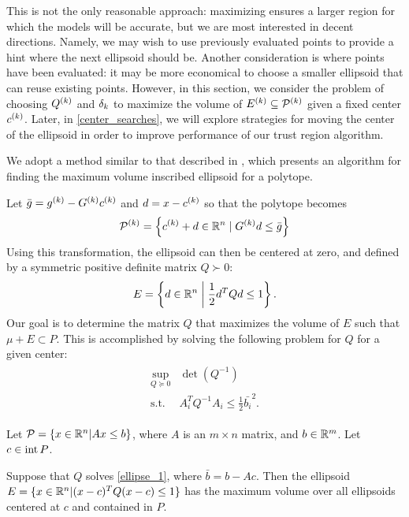 This is not the only reasonable approach: maximizing ensures a larger region for which the models will be accurate, 
but we are most interested in decent directions.
Namely, we may wish to use previously evaluated points to provide a hint where the next ellipsoid should be.
Another consideration is where points have been evaluated: it may be more economical to choose a smaller ellipsoid that can reuse existing points.
However, in this section,  we consider the problem of choosing ${Q^{(k)}}$ and $\delta_k$ to maximize the volume of ${E^{(k)}} \subseteq {{\mathcal{P}}^{(k)}}$ given a fixed center $c^{(k)}$.
Later, in \cref{center_searches}, we will explore strategies for moving the center of the ellipsoid in order to improve performance of our trust region algorithm.

We adopt a method similar to that described in \cite{Khachiyan1993},
which presents an algorithm for finding the maximum volume inscribed ellipsoid for a polytope.

Let $\bar g = {g^{(k)}} - G^{(k)} c^{(k)}$ and $d = x - c^{(k)}$ so that the polytope becomes
\begin{align*}
{{\mathcal{P}}^{(k)}} = \left\{ c^{(k)} + d \in \mathbb R^n \; | \;  G^{(k)} d \le \bar{g} \right\}
\end{align*}
Using this transformation, the ellipsoid can then be centered at zero, and defined by a symmetric positive definite matrix $Q \succ 0$:
\begin{align*}
E = \left\{ d \in \mathbb R^n \; \bigg | \; \frac 1 2 d^T Q d \le 1 \right\}.
\end{align*}
Our goal is to determine the matrix $Q$ that maximizes the volume of $E$ such that $\mu + E \subset P$.
This is accomplished by solving the following problem for $Q$ for a given center:
 \begin{align}
\begin{array}{cc}
 \sup_{Q \succeq 0} & \det(Q^{-1})  \\
 \textrm{s.t.} & A_i^T Q^{-1} A_i \le \frac 1 2 \bar{b_i}^2.
\end{array}
 \label{ellipse_1}
\end{align}


\begin{theorem} 
Let $\mathcal{P} = \{x \in \mathbb R^n | Ax \le b\}$, 
where $A$ is an $m \times n$ matrix, 
and $b \in \mathbb R^m$.  Let $c \in \operatorname{int}{P}$.

Suppose that $Q$ solves \cref{ellipse_1}, where $\bar{b} = b - Ac$.
Then the ellipsoid $E = \{ x \in \mathbb R^n | (x-c)^T Q(x-c) \le 1\}$ has the maximum volume over all ellipsoids centered at $c$ and contained in $P$.
\end{theorem}

